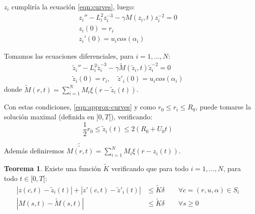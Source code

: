 \documentclass[a4paper,10pt]{scrartcl}
\theoremstyle{definition}
\newtheorem{theorem}{Teorema}
\newcommand{\ktilde}{\widetilde{K}}
\newcommand{\dtilde}[1]{\widetilde{\widetilde{#1}}}
\numberwithin{equation}{section}
\begin{document}
$z_i$ cumpliría la ecuación \eqref{eqn:curves}, luego:
\begin{align*}
 z_i'' - L_i^2 z_i^{-3} - \gamma M(z_i, t) z_i^{-2} = 0\\
 z_i(0) = r_i\\
 z_i'(0) = u_i cos(\alpha_i)
\end{align*}

Tomamos las ecuaciones diferenciales, para $i=1, \ldots, N$:
\begin{align}
 \label{eqn:approx-curves}
 \widetilde{z}_i'' - L_i^{2} \widetilde{z}_i^{-3} - \gamma \widetilde{M}(\widetilde{z}_i, t) \widetilde{z}_i^{-2} = 0\\
 \widetilde{z}_i(0) = r_i, \quad \widetilde{z}'_i(0) = u_i cos(\alpha_i) \nonumber
\end{align}
donde $\widetilde{M}(r,t) = \sum_{i=1}^N M_i \xi(r-\widetilde{z}_i(t))$.

Con estas condiciones, \eqref{eqn:approx-curves} y como $r_0 \le r_i \le R_0$, puede tomarse la solución maximal (definida en $]0,T[$), verificando:
\begin{equation}
    \frac{1}{2}r_0 \le \widetilde{z}_i(t) \le 2(R_0 + U_0t)
\label{eqn:barzbounds}
\end{equation}

Además definiremos $\dtilde{M(r,t)} = \sum_{i=1}^N M_i \xi(r-z_i(t))$.
\begin{theorem}
 Existe una función $\widetilde{K}$ verificando que para todo $i = 1, \ldots, N$, para todo $t\in [0,T[$:
 \begin{align*}
  |z(c,t) - \widetilde{z}_i(t)| + |z'(c,t) - \widetilde{z}'_i(t)| &\le \ktilde\delta \qquad \forall c= (r,u,\alpha) \in S_i \\
  |M(s,t) - \widetilde{M}(s,t)| &\le \ktilde\delta \qquad \forall s \ge 0
 \end{align*}
\end{theorem}
\end{document}
